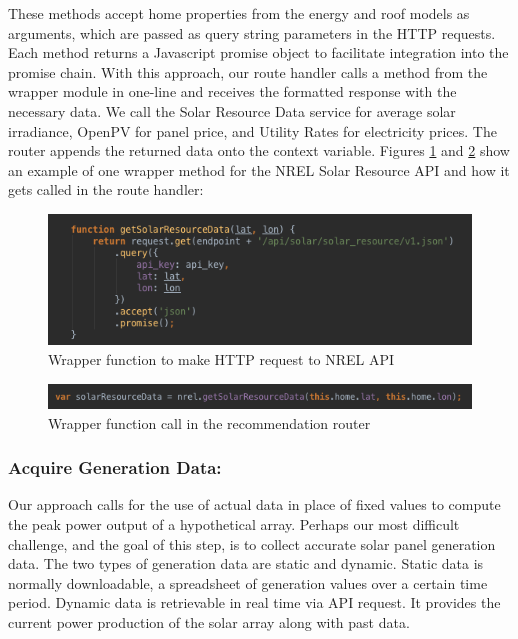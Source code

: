 \documentclass[pageno]{jpaper}
\begin{document}
These methods accept home properties from the energy and roof models as arguments, which are passed as query string parameters in the HTTP requests. Each method returns a Javascript promise object to facilitate integration into the promise chain. With this approach, our route handler calls a method from the wrapper module in one-line and receives the formatted response with the necessary data. We call the Solar Resource Data service for average solar irradiance, OpenPV for panel price, and Utility Rates for electricity prices. The router appends the returned data onto the context variable. Figures \ref{fig:nrel-wrapper} and \ref{fig:nrel-call} show an example of one wrapper method for the NREL Solar Resource API and how it gets called in the route handler:

\begin{figure}[h]
\begin{center}
\includegraphics[scale=0.6] {nrel-wrapper}
\caption{Wrapper function to make HTTP request to NREL API}
\label{fig:nrel-wrapper}
\end{center}
\end{figure}

\begin{figure}[h]
\begin{center}
\includegraphics[scale=0.6] {nrel-call}
\caption{Wrapper function call in the recommendation router}
\label{fig:nrel-call}
\end{center}
\end{figure}


\subsubsection {Acquire Generation Data:}
Our approach calls for the use of actual data in place of fixed values to compute the peak power output of a hypothetical array. Perhaps our most difficult challenge, and the goal of this step, is to collect accurate solar panel generation data. The two types of generation data are static and dynamic. Static data is normally downloadable, a spreadsheet of generation values over a certain time period. Dynamic data is retrievable in real time via API request. It provides the current power production of the solar array along with past data.
\end{document}

